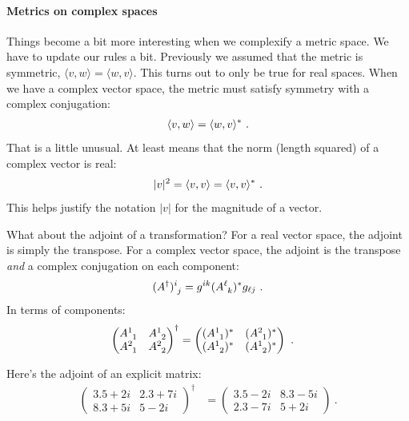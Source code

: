 \documentclass[12pt]{article}
\begin{document}
\paragraph{Metrics on complex spaces}
Things become a bit more interesting when we complexify a metric space. We have to update our rules a bit. Previously we assumed that the metric is symmetric, $\langle v, w\rangle = \langle w, v\rangle$. This turns out to only be true for real spaces. When we have a complex vector space, the metric must satisfy symmetry with a complex conjugation:
\begin{align}
    \langle v, w \rangle = \langle w, v \rangle^* \ .
\end{align}
That is a little unusual. At least means that the norm (length squared) of a complex vector is real:
\begin{align}
    |v|^2 = \langle v, v \rangle = \langle v, v \rangle^* \ .
\end{align}
This helps justify the notation $|v|$ for the magnitude of a vector. 

What about the adjoint of a transformation? For a real vector space, the adjoint is simply the transpose. For a complex vector space, the adjoint is the transpose \emph{and} a complex conjugation on each component:
\begin{align}
    (A^\dag)\aij{i}{j} = g^{ik}(A\aij{\ell}{k})^*g_{\ell j} \ .
\end{align}
In terms of components:
\begin{align}
    \begin{pmatrix}
        A\aij 11 & A\aij 12 \\
        A\aij 21 & A\aij 22 
    \end{pmatrix}^\dag &= 
    \begin{pmatrix}
        (A\aij 11)^* & (A\aij 21)^* \\
        (A\aij 12)^* & (A\aij 12 )^*
    \end{pmatrix} \ .
\end{align}
\begin{example}
Here's the adjoint of an explicit matrix:
\begin{align}
\begin{pmatrix}
        3.5 +2i & 2.3+7i \\
        8.3 + 5i & 5-2i
    \end{pmatrix}^\dag &= 
    \begin{pmatrix}
        3.5 -2i &  8.3 - 5i\\
        2.3 -7i & 5 +2i
    \end{pmatrix} \ .
\end{align}
\end{example}
\end{document}
